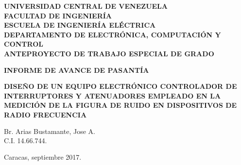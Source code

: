 \documentclass[paper=letter,oneside,fontsize=11pt, parskip=full]{scrartcl}
\begin{document}
		
		
			
		\begin{titlepage}
		
		\begin{center}		
			
			\begin{large}							
				\bfseries
				\uppercase{Universidad Central de Venezuela} \\			
				\uppercase{Facultad de Ingeniería} \\							
				\uppercase{Escuela de Ingeniería Eléctrica} \\
        		\uppercase{Departamento de Electrónica, Computación y Control} \\
        		\uppercase{Anteproyecto de Trabajo Especial de Grado}          	
			\end{large}			
		
			\vfill
			
			\begin{large}
				\bfseries
				\uppercase{Informe de Avance de Pasantía}
			\end{large}
		
			\vspace{2mm}
			
			\begin{Large}
				\begin{spacing}{1.2}
					\bfseries				
		      		\uppercase{Diseño de un equipo electrónico controlador de interruptores y atenuadores empleado en la medición de la figura de ruido en dispositivos de radio frecuencia}	
		      	\end{spacing}
			\end{Large}					
			
			\vfill
			
			\begin{flushright}
				Br. Arias Bustamante, Jose A. \\
				C.I. 14.66.744.
			\end{flushright}
		
			\vfill
			
			\begin{center}
				Caracas, septiembre 2017.
			\end{center}
		
		\end{center}
	
	\end{titlepage}
	
\end{document}
